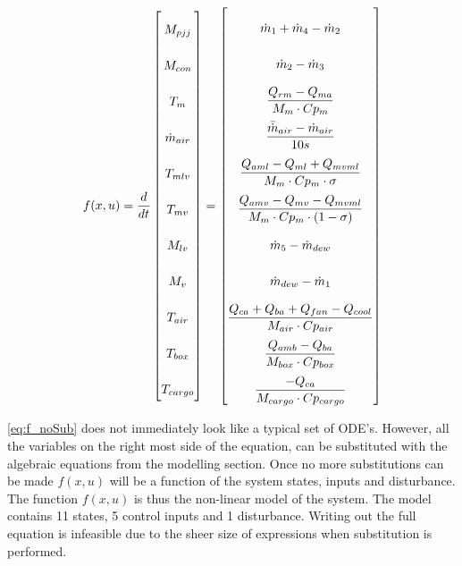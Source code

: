 \begin{equation} \label{eq:f_noSub} \renewcommand{\arraystretch}{2.4}
	f(x,u) =  \dfrac{d}{dt} \begin{bmatrix}
		M_{pjj}			\\				%
		M_{con} 		\\				%
		T_m 			\\				%
		\dot{m}_{air}	\\				%
		T_{mlv}			\\				%
		T_{mv}			\\				%
		M_{lv}			\\				%
		M_v				\\				%
		T_{air}			\\				%
		T_{box}			\\				%
		T_{cargo}		\\				%

	\end{bmatrix}
	=
	\begin{bmatrix}
		\dot{m}_1 + \dot{m}_4 - \dot{m}_2 \\										%
		\dot{m}_{2} - \dot{m}_{3}	\\												%
		\dfrac{Q_{rm} - Q_{ma}}{M_m \cdot Cp_m} \\									%
		\dfrac{\bar{\dot{m}}_{air}  - \dot{m}_{air}} {10s}		\\					%
		\dfrac{Q_{aml}-Q_{ml} + Q_{mvml}}{M_m \cdot Cp_m \cdot \sigma}        \\	%
		\dfrac{Q_{amv} - Q_{mv} - Q_{mvml}}{M_m \cdot Cp_m \cdot (1- \sigma)}	\\	%
		\dot{m}_{5} - \dot{m}_{dew}		\\											%
		\dot{m}_{dew} - \dot{m}_{1}	\\												%
		\dfrac{Q_{ca} + Q_{ba} + Q_{fan} -Q_{cool}}{M_{air} \cdot Cp_{air}} \\		%
		\dfrac{Q_{amb} - Q_{ba}}{M_{box} \cdot Cp_{box}} \\							%
		\dfrac{-Q_{ca}}{M_{cargo} \cdot Cp_{cargo}}									%
	\end{bmatrix}
\end{equation}

\cref{eq:f_noSub} does not immediately look like a typical set of ODE's. However, all the variables on the right most side of the equation, can be substituted with the algebraic equations from the modelling section. Once no more substitutions can be made $f(x,u)$ will be a function of the system states, inputs and disturbance. The function $f(x,u)$ is thus the non-linear model of the system. The model contains 11 states, 5 control inputs and 1 disturbance. Writing out the full equation is infeasible due to the sheer size of expressions when substitution is performed.

